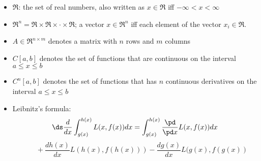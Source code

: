 

\begin{itemize}
\item $\Re$:  the set of real numbers, also written as $x\in\Re$ iff $-\infty<x<\infty$
\item $\Re^n = \Re \times \Re \times \cdot \times\Re$; a vector $x \in \Re^n$ iff each element of the vector $x_i\in \Re$.
\item $A\in \Re^{n\times m}$ denotes a matrix with $n$ rows and $m$ columns
\item $C[a,b]$ denotes the set of functions that are continuous on the interval $a\leq x\leq b$
\item $C^n[a,b]$ denotes the set of functions that has $n$ continuous derivatives on the interval $a\leq x \leq b$
\item Leibnitz's formula: $$\ds \frac{d}{dx}\int_{g(x)}^{h(x)}L(x,f(x))dx = \int_{g(x)}^{h(x)}\frac{\pd}{\pd x}L(x,f(x))dx$$ 
 $$ \qquad+ \frac{d h(x)}{d x}L(h(x),f(h(x)))-\frac{d g(x)}{d x}L(g(x),f(g(x))$$

\end{itemize}
